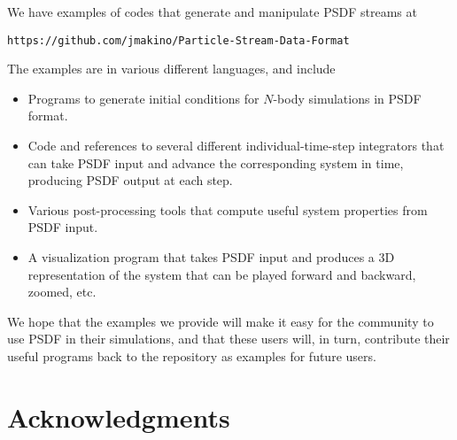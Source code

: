 \documentclass[5p,authoryear]{elsarticle}
\begin{document}
We have examples of codes that generate and manipulate PSDF streams at 
\begin{verbatim}
https://github.com/jmakino/Particle-Stream-Data-Format
\end{verbatim}
The examples are in various different languages, and include
\begin{itemize}
\item Programs to generate initial conditions for $N$-body simulations
  in PSDF format.
\item Code and references to several different individual-time-step
  integrators that can take PSDF input and advance the corresponding
  system in time, producing PSDF output at each step.
\item Various post-processing tools that compute useful system
  properties from PSDF input.
\item A visualization program that takes PSDF input and produces a 3D
  representation of the system that can be played forward and
  backward, zoomed, etc.
\end{itemize}
We hope that the examples we provide will make it easy for the
community to use PSDF in their simulations, and that these users will,
in turn, contribute their useful programs back to the repository as
examples for future users.

\section*{Acknowledgments}



\end{document}
